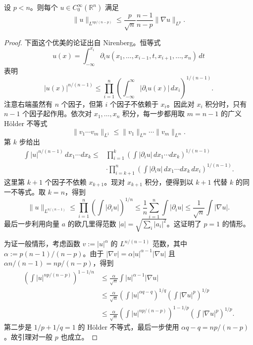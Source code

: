 \begin{lemma}\label{lem:B-1-17}
设 $p<n$。则每个 $u\in C_0^\infty(\mathbb R^n)$ 满足
\[
\|u\|_{L^{np/(n-p)}}\le\frac{p}{\sqrt n}\frac{n-1}{n-p}\|\nabla u\|_{L^p}.
\]
\end{lemma}
\begin{proof}
下面这个优美的论证出自 Nirenberg。恒等式
\[
u(x)=\int_{-\infty}^{x_i}\partial_i u(x_1,\ldots,x_{i-1},t,x_{i+1},\ldots,x_n)\,dt
\]
表明
\[
|u(x)|^{n/(n-1)}\le\prod_{i=1}^n\left(\int_{-\infty}^\infty|\partial_i u(x)|\,dx_i\right)^{1/(n-1)}.
\]
注意右端虽然有 $n$ 个因子，但第 $i$ 个因子不依赖于 $x_i$。因此对 $x_i$ 积分时，只有 $n-1$ 个因子起作用。依次对 $x_1,\ldots,x_n$ 积分，每一步都用取 $m=n-1$ 的广义 Hölder 不等式
\[
\|v_1\cdots v_m\|_{L^1}\le\|v_1\|_{L^m}\cdots\|v_m\|_{L^m}.
\]
第 $k$ 步给出
\begin{align*}
\int|u|^{n/(n-1)}\,dx_1\cdots dx_k
\le{}&\prod_{i=1}^k\left(\int|\partial_i u|\,dx_1\cdots dx_k\right)^{1/(n-1)}\\
&\cdot\prod_{i=k+1}^n\left(\int|\partial_i u|\,dx_1\cdots dx_k\,dx_i\right)^{1/(n-1)}.
\end{align*}
这里第 $k+1$ 个因子不依赖 $x_{k+1}$。现对 $x_{k+1}$ 积分，便得到以 $k+1$ 代替 $k$ 的同一不等式。取 $k=n$，得到
\[
\|u\|_{L^{n/(n-1)}}\le
\prod_{i=1}^n\left(\int|\partial_i u|\right)^{1/n}
\le\frac1n\sum_{i=1}^n\int|\partial_i u|
\le\frac1{\sqrt n}\int|\nabla u|.
\]
最后一步利用向量 $a$ 的欧几里得范数 $|a|=\sqrt{\sum_i|a_i|^2}$。这证明了 $p=1$ 的情形。

为证一般情形，考虑函数 $v:=|u|^\alpha$ 的 $L^{n/(n-1)}$ 范数，其中 $\alpha:=p(n-1)/(n-p)$。由于 $|\nabla v|=\alpha|u|^{\alpha-1}|\nabla u|$ 且 $\alpha n/(n-1)=np/(n-p)$，得到
\begin{align*}
\left(\int|u|^{np/(n-p)}\right)^{1-1/n}
&\le\frac\alpha{\sqrt n}\int|u|^{\alpha-1}|\nabla u|\\
&\le\frac\alpha{\sqrt n}
\left(\int|u|^{\alpha q-q}\right)^{1/q}
\left(\int|\nabla u|^p\right)^{1/p}\\
&\le\frac\alpha{\sqrt n}
\left(\int|u|^{np/(n-p)}\right)^{1-1/p}
\left(\int|\nabla u|^p\right)^{1/p}.
\end{align*}
第二步是 $1/p+1/q=1$ 的 Hölder 不等式，最后一步使用 $\alpha q-q=np/(n-p)$。故引理对一般 $p$ 也成立。
\end{proof}

